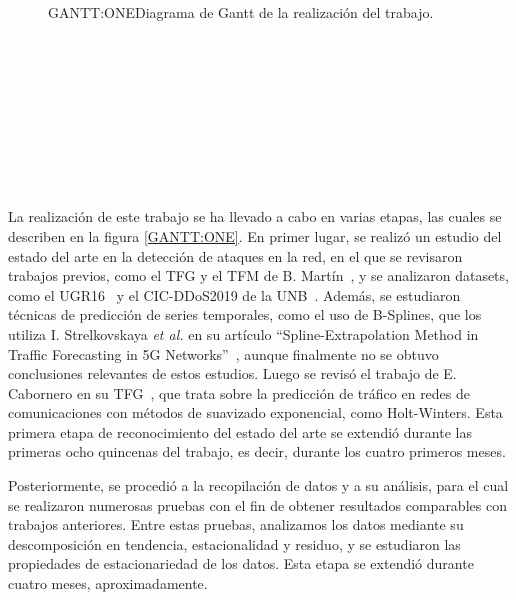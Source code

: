 \begin{figure}[Diagrama de Gantt de la realización del trabajo]{GANTT:ONE}{Diagrama de Gantt de la realización del trabajo.}
\begin{gantt}{1}{24}
     \\
     \\
     \\
     \\
     \\
     \\
     \\
     \\
\end{gantt}
\end{figure}

La realización de este trabajo se ha llevado a cabo en varias etapas, las cuales se describen en la figura \ref{GANTT:ONE}. 
En primer lugar, se realizó un estudio del estado del arte en la detección de ataques en la red, en el que se revisaron trabajos previos, como el \ac{TFG} y el \ac{TFM} de B.  Martín~\cite{benjamin2021, benjamin2023}, y se analizaron datasets, como el UGR16~\cite{datosugr16} y el CIC-DDoS2019 de la \ac{UNB}~\cite{datosunb19}. Además, se estudiaron técnicas de predicción de series temporales, como el uso de B-Splines, que los utiliza I. Strelkovskaya \textit{et al.} en su artículo ``Spline-Extrapolation Method in Traffic Forecasting in 5G Networks''~\cite{strelkovskaya2019}, aunque finalmente no se obtuvo conclusiones relevantes de estos estudios. Luego se revisó el trabajo de E. Cabornero en su \ac{TFG}~\cite{cabornero2021}, que trata sobre la predicción de tráfico en redes de comunicaciones con métodos de suavizado exponencial, como Holt-Winters.
Esta primera etapa de reconocimiento del estado del arte se extendió durante las primeras ocho quincenas del trabajo, es decir, durante los cuatro primeros meses.

Posteriormente, se procedió a la recopilación de datos y a su análisis, para el cual se realizaron numerosas pruebas con el fin de obtener resultados comparables con trabajos anteriores. Entre estas pruebas, analizamos los datos mediante su descomposición en tendencia, estacionalidad y residuo, y se estudiaron las propiedades de estacionariedad de los datos. Esta etapa se extendió durante cuatro meses, aproximadamente.


